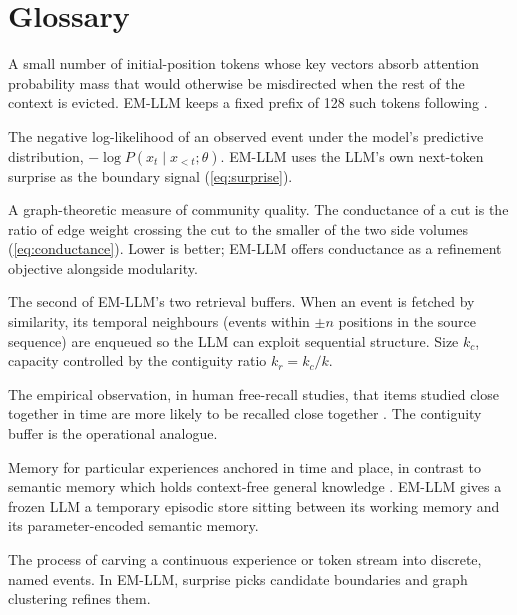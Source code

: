 \section{Glossary}
\label{sec:glossary}

\begin{description}[style=nextline,itemsep=0.4em]
  \item[Attention sink]
  A small number of initial-position tokens whose key vectors absorb attention probability mass that would otherwise be misdirected when the rest of the context is evicted. EM-LLM keeps a fixed prefix of 128 such tokens following \textcite{xiao2024attsinks}.

  \item[Bayesian surprise]
  The negative log-likelihood of an observed event under the model's predictive distribution, $-\log P(x_t \mid x_{<t}; \theta)$. EM-LLM uses the LLM's own next-token surprise as the boundary signal (\cref{eq:surprise}).

  \item[Conductance]
  A graph-theoretic measure of community quality. The conductance of a cut is the ratio of edge weight crossing the cut to the smaller of the two side volumes (\cref{eq:conductance}). Lower is better; EM-LLM offers conductance as a refinement objective alongside modularity.

  \item[Contiguity buffer]
  The second of EM-LLM's two retrieval buffers. When an event is fetched by similarity, its temporal neighbours (events within $\pm n$ positions in the source sequence) are enqueued so the LLM can exploit sequential structure. Size $k_c$, capacity controlled by the contiguity ratio $k_r = k_c / k$.

  \item[Contiguity effect]
  The empirical observation, in human free-recall studies, that items studied close together in time are more likely to be recalled close together \cite{kahana1996contiguity, howard2002contiguity}. The contiguity buffer is the operational analogue.

  \item[Episodic memory]
  Memory for particular experiences anchored in time and place, in contrast to semantic memory which holds context-free general knowledge \cite{tulving1972episodic}. EM-LLM gives a frozen LLM a temporary episodic store sitting between its working memory and its parameter-encoded semantic memory.

  \item[Event segmentation]
  The process of carving a continuous experience or token stream into discrete, named events. In EM-LLM, surprise picks candidate boundaries and graph clustering refines them.


\end{description}
